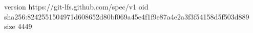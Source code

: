version https://git-lfs.github.com/spec/v1
oid sha256:8242551504971d608652d80bf069a45e4f1f9e87a4e2a3f3f54158d5f503d889
size 4449
